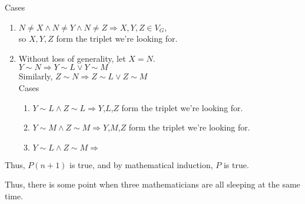 \documentclass[fleqn]{article}
\begin{document}
Cases
\begin{enumerate}
  \item $N \not= X \wedge N \not= Y \wedge N \not= Z \Rightarrow
        X,Y,Z \in V_G$,\\
        so $X,Y,Z$ form the triplet we're looking for.

  \item Without loss of generality, let $X = N$.\\
        $Y \sim N \Rightarrow Y \sim L \vee Y \sim M$\\
        Similarly, $Z \sim N \Rightarrow Z \sim L \vee Z \sim M$\\
        Cases
        \begin{enumerate}
          \item $Y \sim L \wedge Z \sim L \Rightarrow
                Y$,$L$,$Z$ form the triplet we're looking for.
          \item $Y \sim M \wedge Z \sim M \Rightarrow
                Y$,$M$,$Z$ form the triplet we're looking for.
          \item $Y \sim L \wedge Z \sim M \Rightarrow$
        \end{enumerate}
\end{enumerate}
Thus, $P(n+1)$ is true, and by mathematical induction, $P$ is true.

Thus, there is some point when three mathematicians are all sleeping at the same time.
\end{document}
